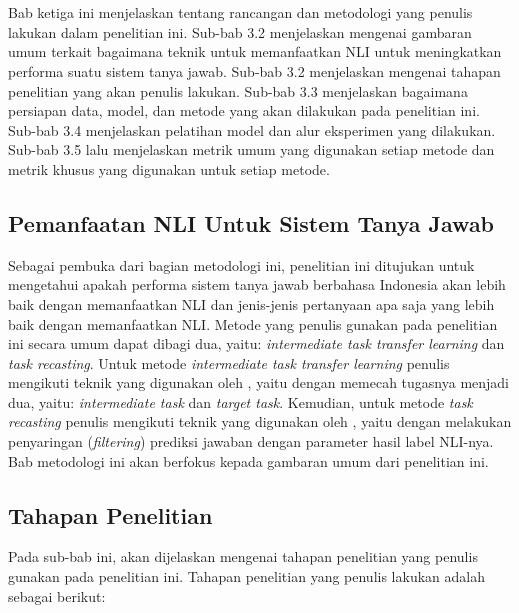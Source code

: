 \chapter{\babTiga}
Bab ketiga ini menjelaskan tentang rancangan dan metodologi yang penulis lakukan dalam penelitian ini. Sub-bab 3.2 menjelaskan mengenai gambaran umum terkait bagaimana teknik untuk memanfaatkan NLI untuk meningkatkan performa suatu sistem tanya jawab. Sub-bab 3.2 menjelaskan mengenai tahapan penelitian yang akan penulis lakukan. Sub-bab 3.3 menjelaskan bagaimana persiapan data, model, dan metode yang akan dilakukan pada penelitian ini. Sub-bab 3.4 menjelaskan pelatihan model dan alur eksperimen yang dilakukan. Sub-bab 3.5 lalu menjelaskan metrik umum yang digunakan setiap metode dan metrik khusus yang digunakan untuk setiap metode.

\section{Pemanfaatan NLI Untuk Sistem Tanya Jawab}

Sebagai pembuka dari bagian metodologi ini, penelitian ini ditujukan untuk mengetahui apakah performa sistem tanya jawab berbahasa Indonesia akan lebih baik dengan memanfaatkan NLI dan jenis-jenis pertanyaan apa saja yang lebih baik dengan memanfaatkan NLI. Metode yang penulis gunakan pada penelitian ini secara umum dapat dibagi dua, yaitu: \emph{intermediate task transfer learning} dan \emph{task recasting}. Untuk metode \emph{intermediate task transfer learning} penulis mengikuti teknik yang digunakan oleh \citeauthor{pruksachatkun-etal-2020-intermediate}, yaitu dengan memecah tugasnya menjadi dua, yaitu: \emph{intermediate task} dan \emph{target task}. Kemudian, untuk metode \emph{task recasting} penulis mengikuti teknik yang digunakan oleh \citeauthor{chen-etal-2021-nli-models}, yaitu dengan melakukan penyaringan (\emph{filtering}) prediksi jawaban dengan parameter hasil label NLI-nya. Bab metodologi ini akan berfokus kepada gambaran umum dari penelitian ini.

\section{Tahapan Penelitian}
Pada sub-bab ini, akan dijelaskan mengenai tahapan penelitian yang penulis gunakan pada penelitian ini. Tahapan penelitian yang penulis lakukan adalah sebagai berikut:

